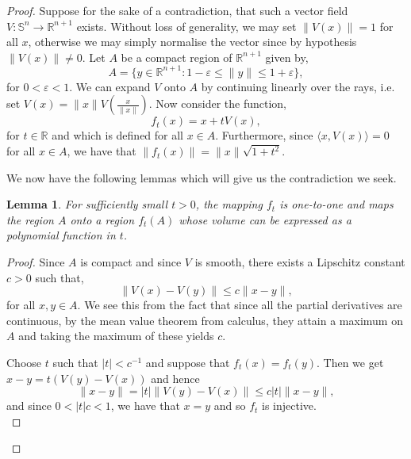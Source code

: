 \documentclass[12pt,a4paper]{article}
\numberwithin{equation}{section}
\newtheorem{lemma}{Lemma}[section]
\theoremstyle{definition}
\theoremstyle{remark}
\begin{document}
\begin{proof}
Suppose for the sake of a contradiction, that such a vector field $V:\mathbb{S}^n\to\mathbb{R}^{n+1}$ exists. Without loss of generality, we may set $\|V(x)\|=1$ for all $x$, otherwise we may simply normalise the vector since by hypothesis $\|V(x)\|\neq 0$. Let $A$ be a compact region of $\mathbb{R}^{n+1}$ given by,
\[
A=\{y\in\mathbb{R}^{n+1}:1-\varepsilon\leq\|y\|\leq 1+\varepsilon\},
\] 
for $0<\varepsilon<1$. We can expand $V$ onto $A$ by continuing linearly over the rays, i.e. set $V(x)=\|x\|V(\frac{x}{\|x\|})$. Now consider the function,
\[
f_t(x)=x+tV(x),
\]
for $t\in\mathbb{R}$ and which is defined for all $x\in A$. Furthermore, since $\langle x,V(x)\rangle=0$ for all $x\in A$, we have that $\|f_t(x)\|=\|x\|\sqrt{1+t^2}$.

We now have the following lemmas which will give us the contradiction we seek.
\begin{lemma}
For sufficiently small $t>0$, the mapping $f_t$ is one-to-one and maps the region $A$ onto a region $f_t(A)$ whose volume can be expressed as a polynomial function in $t$.
\end{lemma}
\begin{proof}
Since $A$ is compact and since $V$ is smooth, there exists a Lipschitz constant $c>0$ such that,
\[
\|V(x)-V(y)\|\leq c\|x-y\|,
\]
for all $x,y\in A$. We see this from the fact that since all the partial derivatives are continuous, by the mean value theorem from calculus, they attain a maximum on $A$ and taking the maximum of these yields $c$.

Choose $t$ such that $|t|<c^{-1}$ and suppose that $f_t(x)=f_t(y)$. Then we get $x-y=t(V(y)-V(x))$ and hence \[\|x-y\|=|t|\|V(y)-V(x)\|\leq c|t|\|x-y\|,\] and since $0<|t|c<1$, we have that $x=y$ and so $f_t$ is injective.\\


\end{proof}
\end{proof}
\end{document}
